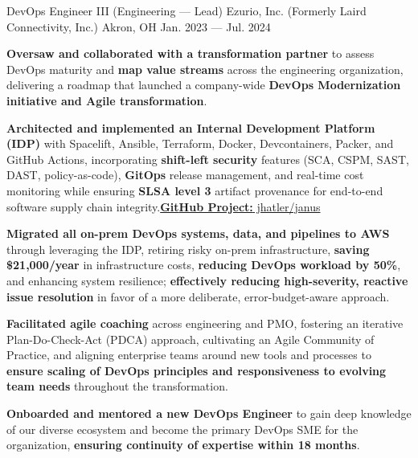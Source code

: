 \begin{cventries}
    \cventry
        { DevOps Engineer III (Engineering --- Lead) }
        { Ezurio, Inc. (Formerly Laird Connectivity, Inc.) }
        { Akron, OH }
        { Jan. 2023 --- Jul. 2024 }
        {
            \begin{cvitems}
                \item{\textbf{Oversaw and collaborated with a transformation partner} to assess DevOps maturity and \textbf{map value streams} across the engineering organization, delivering a roadmap that launched a company-wide \textbf{DevOps Modernization initiative and Agile transformation}.}
                \item{\textbf{Architected and implemented an Internal Development Platform (IDP)} with Spacelift, Ansible, Terraform, Docker, Devcontainers, Packer, and GitHub Actions, incorporating \textbf{shift-left security} features (SCA, CSPM, SAST, DAST, policy-as-code), \textbf{GitOps} release management, and real-time cost monitoring while ensuring \textbf{SLSA level 3} artifact provenance for end-to-end software supply chain integrity.\hfill{\href{https://github.com/jhatler/janus}{\textbf{{\color{awesome}Git}Hub Project:} jhatler/janus}}}
                \item{\textbf{Migrated all on-prem DevOps systems, data, and pipelines to AWS} through leveraging the IDP, retiring risky on-prem infrastructure, \textbf{saving \$21,000/year} in infrastructure costs, \textbf{reducing DevOps workload by 50\%}, and enhancing system resilience; \textbf{effectively reducing high-severity, reactive issue resolution} in favor of a more deliberate, error-budget-aware approach.}
                \item{\textbf{Facilitated agile coaching} across engineering and PMO, fostering an iterative Plan-Do-Check-Act (PDCA) approach, cultivating an Agile Community of Practice, and aligning enterprise teams around new tools and processes to \textbf{ensure scaling of DevOps principles and responsiveness to evolving team needs} throughout the transformation.}
                \item{\textbf{Onboarded and mentored a new DevOps Engineer} to gain deep knowledge of our diverse ecosystem and become the primary DevOps SME for the organization, \textbf{ensuring continuity of expertise within 18 months}.}
            \end{cvitems}
        }
\end{cventries}
